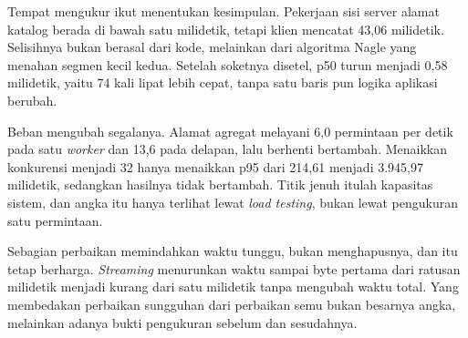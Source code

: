 Tempat mengukur ikut menentukan kesimpulan. Pekerjaan sisi server alamat
katalog berada di bawah satu milidetik, tetapi klien mencatat 43,06
milidetik. Selisihnya bukan berasal dari kode, melainkan dari algoritma Nagle
yang menahan segmen kecil kedua. Setelah soketnya disetel, p50 turun menjadi
0,58 milidetik, yaitu 74 kali lipat lebih cepat, tanpa satu baris pun logika
aplikasi berubah.

Beban mengubah segalanya. Alamat agregat melayani 6,0 permintaan per detik
pada satu \textit{worker} dan 13,6 pada delapan, lalu berhenti bertambah.
Menaikkan konkurensi menjadi 32 hanya menaikkan p95 dari 214,61 menjadi
3.945,97 milidetik, sedangkan hasilnya tidak bertambah. Titik jenuh itulah
kapasitas sistem, dan angka itu hanya terlihat lewat \textit{load testing},
bukan lewat pengukuran satu permintaan.

Sebagian perbaikan memindahkan waktu tunggu, bukan menghapusnya, dan itu
tetap berharga. \textit{Streaming} menurunkan waktu sampai byte pertama dari
ratusan milidetik menjadi kurang dari satu milidetik tanpa mengubah waktu
total. Yang membedakan perbaikan sungguhan dari perbaikan semu bukan
besarnya angka, melainkan adanya bukti pengukuran sebelum dan sesudahnya.
